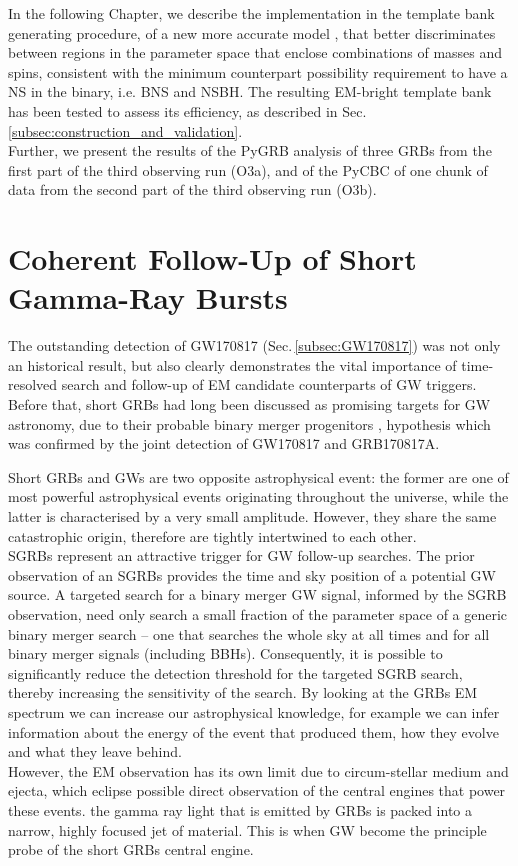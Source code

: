 \documentclass[binding=0.6cm, LaM]{sapthesis}
\begin{document}
	In the following Chapter, we describe the implementation in the template bank generating procedure,
	of a new more accurate model \cite{205}, that better discriminates between regions in the parameter space 
	that enclose combinations of masses and spins,
        consistent with the minimum counterpart possibility requirement to have a NS in the binary, i.e. BNS and NSBH.
	The resulting EM-bright template bank has been tested to assess its efficiency, as described in Sec.\,\ref{subsec:construction_and_validation}. \\
	Further, we present the results of the PyGRB analysis of three GRBs from the first part of the third  observing run (O3a), and 
	of the PyCBC of one chunk of data from the second part of the third observing run (O3b).

\section{Coherent Follow-Up of Short Gamma-Ray Bursts}
	The outstanding detection of GW170817 (Sec.\,\ref{subsec:GW170817}) was not only an historical result,
        but also clearly demonstrates the vital importance of time-resolved search and follow-up of EM candidate counterparts of GW triggers.
        Before that, short GRBs had long been discussed as promising targets for GW astronomy,
        due to their probable binary merger progenitors \cite{162},
        hypothesis which was confirmed by the joint detection of GW170817  and GRB170817A.	

	Short GRBs and GWs are two opposite astrophysical event:
	the former are one of most powerful astrophysical events originating throughout the universe,
	while the latter is characterised by a very small amplitude.
	However, they share the same catastrophic origin, 
	therefore are tightly intertwined to each other. \\
	SGRBs represent an attractive trigger for GW follow-up searches. 
	The prior observation of an SGRBs provides the time and sky position of a potential GW source. 
	A targeted search for a binary merger GW signal, 
	informed by the SGRB observation, need only search a small fraction of the parameter space
	of a generic binary merger search – one that searches the whole sky at all times and for all binary merger signals (including BBHs). 	
	Consequently, it is possible to significantly reduce the detection threshold for the targeted SGRB search,
	thereby increasing the sensitivity of the search.  
	By looking at the GRBs EM spectrum we can increase our astrophysical knowledge,
	for example we can infer information about the energy of the event that produced them,
	how they evolve and what they leave behind. \\
	However, the EM observation has its own limit due to circum-stellar medium and ejecta,
	which eclipse possible direct observation of the central engines that power these events.
	the gamma ray light that is emitted by GRBs is packed into a narrow, highly focused jet of material.
	This is when GW become the principle probe of the short GRBs central engine.
	
\end{document}

